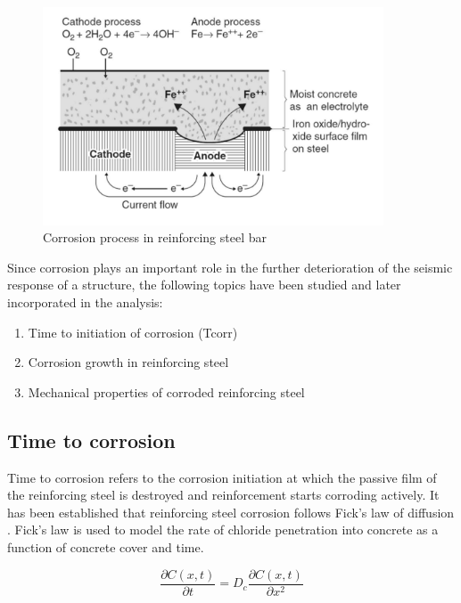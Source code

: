 \begin{figure}[htbp]
\centering
\includegraphics[width=0.9\textwidth]{Chapter-2/figs/Corrosion_Process}
\caption{Corrosion process in reinforcing steel bar \cite{Mehta2014}}
\label{fig:corr1}
\end{figure}

Since corrosion plays an important role in the further deterioration of the seismic response of a structure, the following topics have been studied and later incorporated in the analysis:

\begin{enumerate}
	\item Time to initiation of corrosion (Tcorr)
	\item Corrosion growth in reinforcing steel
	\item Mechanical properties of corroded reinforcing steel
\end{enumerate}

 
\subsection{Time to corrosion}

Time to corrosion refers to the corrosion initiation at which the passive film of the reinforcing steel is destroyed and reinforcement starts corroding actively. It has been established that reinforcing steel corrosion follows Fick's law of diffusion \cite{Ghosh2010}\cite{Thoft-Christensen}\cite{Stewart1998}\cite{Y.Liu1998a}. Fick's law is used to model the rate of chloride penetration into concrete as a function of concrete cover and time. 

\begin{equation}
	\frac{\partial C(x,t)}{\partial t} = D_c \frac{\partial C(x,t)}{\partial x^2}
	\label{eq:ficks_law}
\end{equation}
\newline

